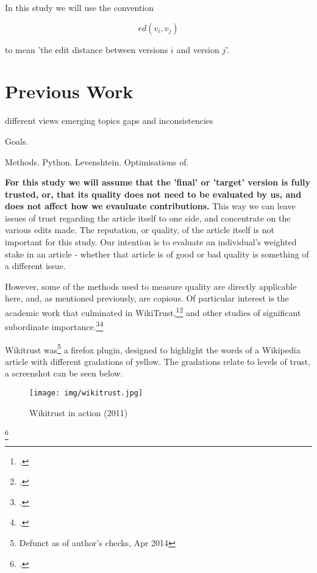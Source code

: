 \documentclass[a4paper,11pt,twoside,notitlepage]{article}
\renewcommand{\cite}[1]{\footcite{#1}}
\begin{document}
         In this study we will use
        the convention 

        $$ed(v_i,v_j)$$ 

        to mean 'the edit distance between
        versions $i$ and version $j$'. 


        \section{Previous Work}
        different views emerging topics gaps and inconsistencies

        Goals.

        Methods. Python. Levenshtein. Optimisations of.
     
        \textbf{For this study we will assume that the 'final' or
          'target' version is fully trusted, or, that its quality does
          not need to be evaluated by us, and does not affect how we
          evauluate contributions.} This way we can leave issues of
        trust regarding the article itself to one side, and
        concentrate on the various edits made. The reputation, or
        quality, of the article itself is not important for this
        study. Our intention is to evaluate an individual's weighted
        stake in an article - whether that article is of good or bad
        quality is something of a different issue.

        However, some of the methods used to measure quality are
        directly applicable here, and, as mentioned previously, are
        copious. Of particular interest is the academic work that
        culminated in WikiTrust,\cite{Adler2006}\cite{Adler2007} and
        other studies of significant subordinate
        importance.\cite{Zeng2006}\cite{Cross2006}

        Wikitrust was\footnote{Defunct as of author's checks, Apr
          2014} a firefox plugin, designed to highlight the
        words of a Wikipedia article with different gradations of
        yellow. The gradations relate to levels of trust, a screenshot
        can be seen below.
        
       \begin{figure}
         \centering
         \texttt{[image: img/wikitrust.jpg]}
         \caption{Wikitrust in action (2011)}
         \label{fig:wikitrust}
       \end{figure}

 \cite{Lucassen2011} 
\end{document}
